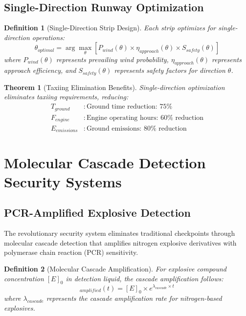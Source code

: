 \documentclass[12pt,a4paper]{article}
\newtheorem{theorem}{Theorem}
\newtheorem{definition}{Definition}
\begin{document}
\subsection{Single-Direction Runway Optimization}

\begin{definition}[Single-Direction Strip Design]
Each strip optimizes for single-direction operations:
\begin{equation}
\theta_{optimal} = \arg\max_{\theta} \left[ P_{wind}(\theta) \times \eta_{approach}(\theta) \times S_{safety}(\theta) \right]
\end{equation}
where $P_{wind}(\theta)$ represents prevailing wind probability, $\eta_{approach}(\theta)$ represents approach efficiency, and $S_{safety}(\theta)$ represents safety factors for direction $\theta$.
\end{definition}

\begin{theorem}[Taxiing Elimination Benefits]
Single-direction optimization eliminates taxiing requirements, reducing:
\begin{align}
T_{ground} &: \text{Ground time reduction: } 75\% \\
F_{engine} &: \text{Engine operating hours: } 60\% \text{ reduction} \\
E_{emissions} &: \text{Ground emissions: } 80\% \text{ reduction}
\end{align}
\end{theorem}

\section{Molecular Cascade Detection Security Systems}

\subsection{PCR-Amplified Explosive Detection}

The revolutionary security system eliminates traditional checkpoints through molecular cascade detection that amplifies nitrogen explosive derivatives with polymerase chain reaction (PCR) sensitivity.

\begin{definition}[Molecular Cascade Amplification]
For explosive compound concentration $[E]_0$ in detection liquid, the cascade amplification follows:
\begin{equation}
[E]_{amplified}(t) = [E]_0 \times e^{\lambda_{cascade} \times t}
\end{equation}
where $\lambda_{cascade}$ represents the cascade amplification rate for nitrogen-based explosives.
\end{definition}
\end{document}
